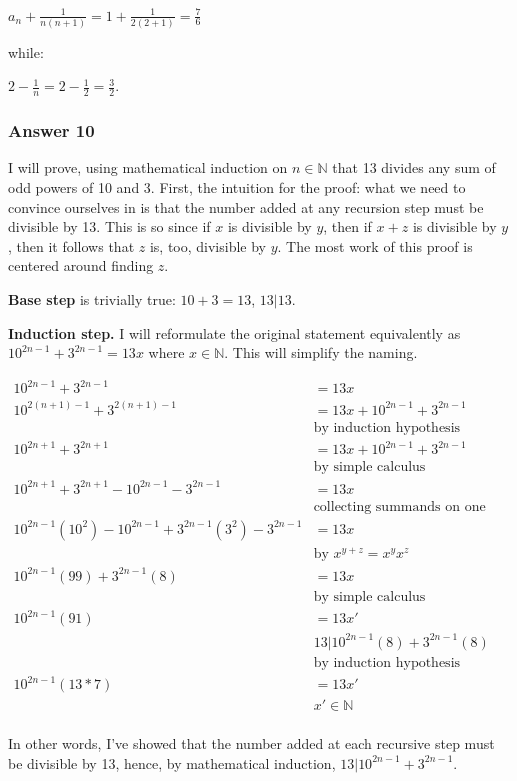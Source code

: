 \documentclass[11pt]{article}
\begin{document}
$a_n+\frac{1}{n(n+1)}=1+\frac{1}{2(2+1)}=\frac{7}{6}$

while:

$2 - \frac{1}{n}=2 - \frac{1}{2}= \frac{3}{2}$.
\subsubsection{Answer 10}
\label{sec-1-4-2}
I will prove, using mathematical induction on $n \in \mathbb{N}$ that 13
divides any sum of odd powers of 10 and 3.  First, the intuition for the
proof: what we need to convince ourselves in is that the number added at any
recursion step must be divisible by 13.  This is so since if $x$ is
divisible by $y$, then if $x+z$ is divisible by $y$, then it follows that
$z$ is, too, divisible by $y$.  The most work of this proof is centered
around finding $z$.

\textbf{Base step} is trivially true: $10+3=13$, $13|13$.

\textbf{Induction step.} I will reformulate the original statement equivalently
as $10^{2n-1}+3^{2n-1}=13x$ where $x \in \mathbb{N}$.  This will
simplify the naming.

\begin{align*}
  10^{2n-1}+3^{2n-1} &= 13x \\
  10^{2(n+1)-1}+3^{2(n+1)-1} &= 13x + 10^{2n-1}+3^{2n-1} \\
  & \textrm{by induction hypothesis} \\
  10^{2n+1}+3^{2n+1} &= 13x + 10^{2n-1}+3^{2n-1} \\
  & \textrm{by simple calculus} \\
  10^{2n+1}+3^{2n+1}-10^{2n-1}-3^{2n-1} &= 13x \\
  & \textrm{collecting summands on one side} \\
  10^{2n-1}(10^2)-10^{2n-1}+3^{2n-1}(3^2)-3^{2n-1} &= 13x \\
  & \textrm{by $x^{y+z}=x^yx^z$} \\
  10^{2n-1}(99)+3^{2n-1}(8) &= 13x \\
  & \textrm{by simple calculus} \\
  10^{2n-1}(91) &= 13x' \\
  & \textrm{$13|10^{2n-1}(8)+3^{2n-1}(8)$} \\
  & \textrm{by induction hypothesis} \\
  10^{2n-1}(13*7) &= 13x' \\
  & \textrm{$x' \in \mathbb{N}$} \\
\end{align*}

In other words, I've showed that the number added at each recursive step must
be divisible by 13, hence, by mathematical induction, $13|10^{2n-1}+3^{2n-1}$.
\end{document}
